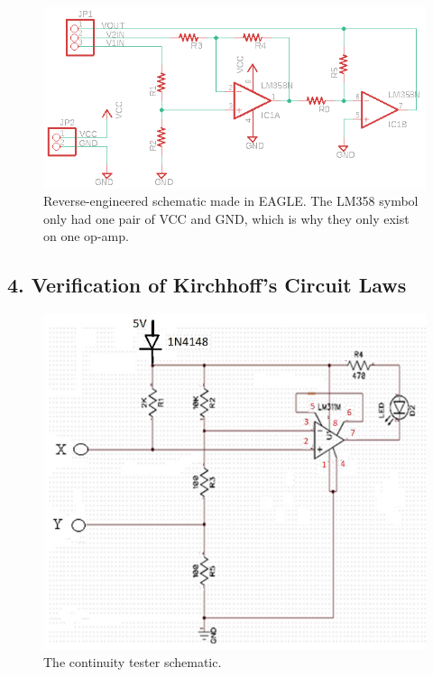 \documentclass[12pt]{article}
\begin{document}
\begin{figure}[H]
    \centering
    
    \includegraphics[width=0.7\linewidth]{revsch.png}
    
    \caption{Reverse-engineered schematic made in EAGLE. The LM358 symbol only had 
    one pair of VCC and GND, which is why they only exist on one op-amp.}
    \label{fig:revsch}
\end{figure}

\subsection*{4. Verification of Kirchhoff's Circuit Laws}

\begin{figure}[H]
    \centering
    \includegraphics[width=0.4\linewidth]{ctestsch.png}
    \caption{The continuity tester schematic.}
    \label{fig:ctestsch}
\end{figure}
\end{document}
